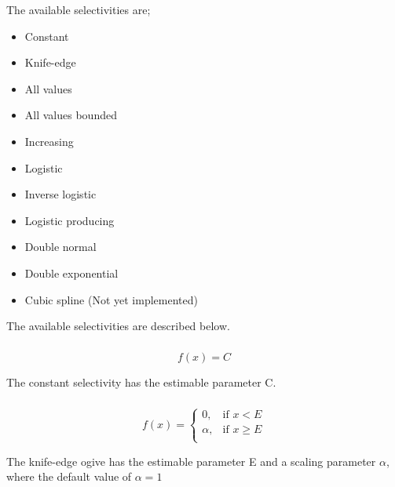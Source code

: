 The available selectivities are;

\begin{itemize}
  \item Constant
  \item Knife-edge
  \item All values
  \item All values bounded
  \item Increasing
  \item Logistic
  \item Inverse logistic
  \item Logistic producing
  \item Double normal
  \item Double exponential
  \item Cubic spline (Not yet implemented)
\end{itemize}

The available selectivities are described below.

\subsubsection[Constant]{}

\begin{equation}
f(x)=C
\end{equation}

The constant selectivity has the estimable parameter C. 

\subsubsection[Knife-edge]{}

\begin{equation}
f(x)= \begin{cases}
  0, & \text{if $x < E$} \\
  \alpha, & \text{if $x \ge E$}\\ 
  \end{cases} 
\end{equation}

The knife-edge ogive has the estimable parameter E and a scaling parameter $\alpha$, where the default value of $\alpha = 1$

\subsubsection[All-values]{}

